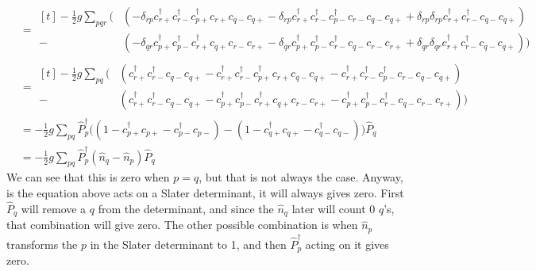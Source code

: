 \documentclass[norsk,a4paper,12pt]{article}
\begin{document}
\begin{align*}
[\hat{V},\hat{P}]&=
\begin{aligned}[t]
-\frac{1}{2}g\sum_{pqr}\Big(&(-\delta_{rp}c_{r+}^{\dagger}c_{r-}^{\dagger}c_{p+}^{\dagger}c_{r+}c_{q-}c_{q+}-\delta_{rp}c_{r+}^{\dagger}c_{r-}^{\dagger}c_{p-}^{\dagger}c_{r-}c_{q-}c_{q+}+\delta_{rp}\delta_{rp}c_{r+}^{\dagger}c_{r-}^{\dagger}c_{q-}c_{q+})\\
-&(-\delta_{qr}c_{p+}^{\dagger}c_{p-}^{\dagger}c_{r+}^{\dagger}c_{q+}c_{r-}c_{r+}-\delta_{qr}c_{p+}^{\dagger}c_{p-}^{\dagger}c_{r-}^{\dagger}c_{q-}c_{r-}c_{r+}+\delta_{qr}\delta_{qr}c_{r+}^{\dagger}c_{r-}^{\dagger}c_{q-}c_{q+})\Big)
\end{aligned}\\
&=
\begin{aligned}[t]
-\frac{1}{2}g\sum_{pq}\Big(&(c_{r+}^{\dagger}c_{r-}^{\dagger}c_{q-}c_{q+}-c_{r+}^{\dagger}c_{r-}^{\dagger}c_{p+}^{\dagger}c_{r+}c_{q-}c_{q+}-c_{r+}^{\dagger}c_{r-}^{\dagger}c_{p-}^{\dagger}c_{r-}c_{q-}c_{q+})\\
-&(c_{r+}^{\dagger}c_{r-}^{\dagger}c_{q-}c_{q+}-c_{p+}^{\dagger}c_{p-}^{\dagger}c_{r+}^{\dagger}c_{q+}c_{r-}c_{r+}-c_{p+}^{\dagger}c_{p-}^{\dagger}c_{r-}^{\dagger}c_{q-}c_{r-}c_{r+})\Big)
\end{aligned}\\
&=-\frac{1}{2}g\sum_{pq}\hat{P}_p^{\dagger}\Big((1-c_{p+}^{\dagger}c_{p+}-c_{p-}^{\dagger}c_{p-})-(1-c_{q+}^{\dagger}c_{q+}-c_{q-}^{\dagger}c_{q-})\Big)\hat{P}_q\\
&=-\frac{1}{2}g\sum_{pq}\hat{P}_p^{\dagger}(\hat{n}_q-\hat{n}_p)\hat{P}_q
\end{align*}
We can see that this is zero when $p=q$, but that is not always the case. Anyway, is the equation above acts on a Slater determinant, it will always gives zero. First $\hat{P}_q$ will remove a $q$ from the determinant, and since the $\hat{n}_q$ later will count 0 $q$'s, that combination will give zero. The other possible combination is when $\hat{n}_p$ transforms the $p$ in the Slater determinant to 1, and then $\hat{P}_p^{\dagger}$ acting on it gives zero.
\end{document}
